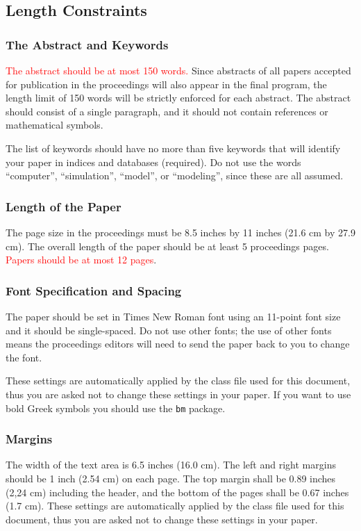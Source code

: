 \documentclass{scspaperproc}
\theoremstyle{scsthe}
\begin{document}
    \subsection{Length Constraints}

    \subsubsection{The Abstract and Keywords}
    \textcolor{red}{The abstract should be at most 150 words.} Since abstracts of all papers accepted for publication in the proceedings will also appear in the final program, the length limit of 150 words will be strictly enforced for each abstract. The abstract should consist of a single paragraph, and it should not contain references or mathematical symbols.

    The list of keywords should have no more than five keywords that will identify your paper in indices and databases (required). Do not use the words “computer”, “simulation”, “model”, or “modeling”, since these are all assumed.

    \subsubsection{Length of the Paper}
    The page size in the proceedings must be 8.5 inches by 11 inches (21.6 cm by 27.9 cm). The overall length of the paper should be at least 5 proceedings pages. \textcolor{red}{Papers should be at most 12 pages}.

    \subsubsection{Font Specification and Spacing}
    The paper should be set in Times New Roman font using an 11-point font size and it should be single-spaced. Do not use other fonts; the use of other fonts means the proceedings editors will need to send the paper back to you to change the font.

    These settings are automatically applied by the class file used for this document, thus you are asked not to change these settings in your paper. If you want to use bold Greek symbols you should use the \texttt{bm} package.

    \subsubsection{Margins}
    \label{sec:margins}

    The width of the text area is 6.5 inches (16.0 cm). The left and right margins should be 1 inch (2.54 cm) on each page. The top margin shall be 0.89 inches (2,24 cm) including the header, and the bottom of the pages shall be 0.67 inches (1.7 cm). These settings are automatically applied by the class file used for this document, thus you are asked not to change these settings in your paper.
\end{document}
